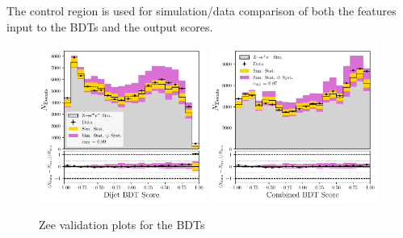 The control region is used for simulation/data comparison of both the features input to the BDTs and the output scores. 
\begin{figure}[h!]
    \begin{center}
        \includegraphics[width=0.49\textwidth]{figures/event_selection/dijet_BDT_zee_PS.pdf}
        \includegraphics[width=0.49\textwidth]{figures/event_selection/combined_BDT_zee_PS.pdf}
    \end{center}
    \caption{Zee validation plots for the BDTs}
    \label{fig:event_categorisation:zee_bdt_score_validation}
\end{figure}


